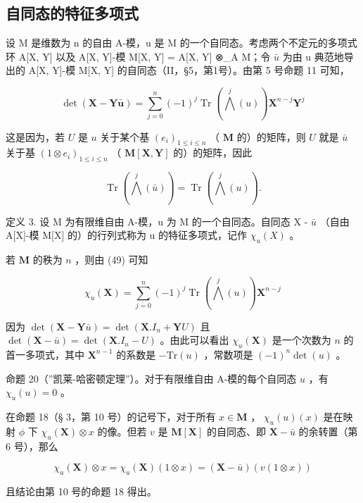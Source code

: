\subsection{自同态的特征多项式}

设 M 是维数为 n 的自由 A-模，u 是 M 的一个自同态。考虑两个不定元的多项式环 A{[}X, Y{]} 以及 A{[}X, Y{]}-模 M{[}X, Y{]} = A{[}X, Y{]} ⊗\_A M；令 \(\bar{u}\) 为由 u 典范地导出的 A{[}X, Y{]}-模 M{[}X, Y{]} 的自同态（II，§5，第1号）。由第 5 号命题 11 可知，

\[
\det (\mathbf {X} - \mathbf {Y} \bar {\boldsymbol {u}}) = \sum_ {j = 0} ^ {n} (- 1) ^ {j} \operatorname{Tr} \left(\bigwedge^ {j} (u)\right) \mathbf {X} ^ {n - j} \mathbf {Y} ^ {j}\tag{49}
\]

这是因为，若 \(U\) 是 \(u\) 关于某个基 \((e_i)_{1 \leqslant i \leqslant n}\) （ \(\mathbf{M}\) 的）的矩阵，则 \(U\) 就是 \(\bar{u}\) 关于基 \((1 \otimes e_i)_{1 \leqslant i \leqslant n}\) （ \(\mathbf{M}[\mathbf{X}, \mathbf{Y}]\) 的）的矩阵，因此

\[
\operatorname{Tr} \left(\bigwedge^ {j} (\bar {u})\right) = \operatorname{Tr} \left(\bigwedge^ {j} (u)\right).
\]

定义 3. 设 M 为有限维自由 A-模，u 为 M 的一个自同态。自同态 X - \(\bar{u}\) （自由 A{[}X{]}-模 M{[}X{]} 的）的行列式称为 u 的特征多项式，记作 \(\chi_u(X)\) 。

若 \(\mathbf{M}\) 的秩为 \(n\) ，则由 (49) 可知

\[
\chi_ {u} (\mathbf {X}) = \sum_ {j = 0} ^ {n} (- 1) ^ {j} \operatorname{Tr} \left(\bigwedge^ {j} (u)\right) \mathbf {X} ^ {n - j}\tag{50}
\]

因为 \(\operatorname{det}(\mathbf{X} - \mathbf{Y}\bar{u}) = \operatorname{det}(\mathbf{X}.I_n + \mathbf{Y}U)\) 且 \(\operatorname{det}(\mathbf{X} - \bar{u}) = \operatorname{det}(\mathbf{X}.I_n - U)\) 。由此可以看出 \(\chi_u(\mathbf{X})\) 是一个次数为 \(n\) 的首一多项式，其中 \(\mathbf{X}^{n-1}\) 的系数是 \(-\mathrm{Tr}(u)\) ，常数项是 \((-1)^n \operatorname{det}(u)\) 。

命题 20（”凯莱-哈密顿定理”）。对于有限维自由 A-模的每个自同态 \(u\) ，有 \(\chi_u(u) = 0\) 。

在命题 18（§ 3，第 10 号）的记号下，对于所有 \(x \in \mathbf{M}\) ， \(\chi_u(u)(x)\) 是在映射 \(\phi\) 下 \(\chi_u(\mathbf{X}) \otimes x\) 的像。但若 \(v\) 是 \(\mathbf{M}[\mathbf{X}]\) 的自同态、即 \(\mathbf{X} - \bar{u}\) 的余转置（第 6 号），那么

\[
\chi_ {u} (\mathbf {X}) \otimes x = \chi_ {u} (\mathbf {X}) (1 \otimes x) = (\mathbf {X} - \bar {u}) (v (1 \otimes x))
\]

且结论由第 10 号的命题 18 得出。

